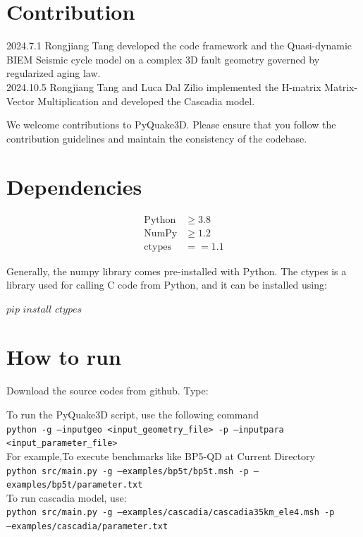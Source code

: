 \documentclass[a4paper,12pt]{article}
\begin{document}
\section{Contribution}
2024.7.1  Rongjiang Tang developed the code framework and the Quasi-dynamic BIEM Seismic cycle model on a complex 3D fault geometry governed by regularized aging law.\\

2024.10.5 Rongjiang Tang and Luca Dal Zilio implemented the H-matrix Matrix-Vector Multiplication and developed the Cascadia model.

We welcome contributions to PyQuake3D. Please ensure that you follow the contribution guidelines and maintain the consistency of the codebase.

\section{Dependencies}

\begin{align*}
    \text{Python} &\geq 3.8 \\
    \text{NumPy} &\geq 1.2 \\
    \text{ctypes} &== 1.1
\end{align*}


Generally, the numpy library comes pre-installed with Python. The ctypes is a library used for calling C code from Python, and it can be installed using:

$pip$ $install$ $ctypes$

\section{How to run}
Download the source codes from github. Type:

To run the PyQuake3D script, use the following command\\
\texttt{python -g --inputgeo <input\_geometry\_file> -p --inputpara <input\_parameter\_file>}\\

For example,To execute benchmarks like BP5-QD at Current Directory\\
\texttt{python src/main.py -g --examples/bp5t/bp5t.msh -p --examples/bp5t/parameter.txt}\\

To run cascadia model, use:\\
\texttt{python src/main.py -g --examples/cascadia/cascadia35km\_ele4.msh -p \\--examples/cascadia/parameter.txt}\\
\end{document}
